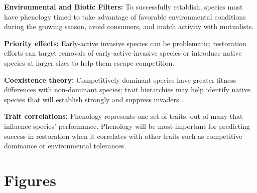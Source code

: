 \documentclass[11pt]{article}
\begin{document}
{\bf Environmental and Biotic Filters:} To successfully establish, species must have phenology timed to take advantage of favorable environmental conditions during the growing season, avoid consumers, and match activity with mutualists.

{\bf Priority effects:} Early-active invasive species can be problematic; restoration efforts can target removals of early-active invasive species or introduce native species at larger sizes to help them escape competition.

{\bf Coexistence theory:} Competitively dominant species have greater fitness differences with non-dominant species; trait hierarchies may help identify native species that will establish strongly and suppress invaders \citep{funk2016testing,wagg2017functional}. 

{\bf Trait correlations:} Phenology represents one set of traits, out of many that influence species’ performance. Phenology will be most important for predicting success in restoration when it correlates with other traits such as competitive dominance or environmental tolerances.


\newpage
\section{Figures}
\end{document}
